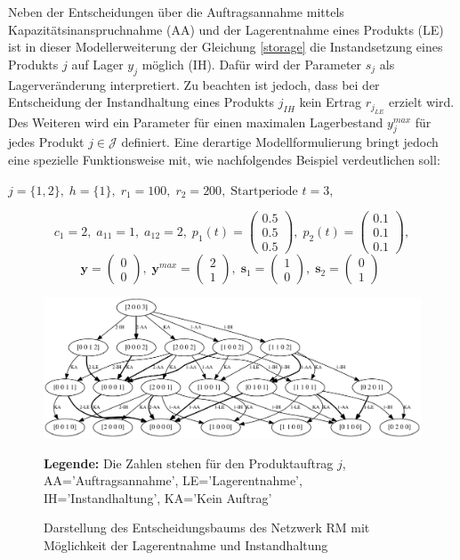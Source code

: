 Neben der Entscheidungen über die Auftragsannahme mittels Kapazitätsinanspruchnahme (AA) und der Lagerentnahme eines Produkts (LE) ist in dieser Modellerweiterung der Gleichung \eqref{storage} die Instandsetzung eines Produkts $j$ auf Lager $y_{j}$ möglich (IH). Dafür wird der Parameter $s_{j}$ als Lagerveränderung interpretiert. Zu beachten ist jedoch, dass bei der Entscheidung der Instandhaltung eines Produkts $j_{IH}$ kein Ertrag $r_{j_{LE}}$ erzielt wird. Des Weiteren wird ein Parameter für einen maximalen Lagerbestand $y_{j}^{max}$ für jedes Produkt $j\in\mathcal{J}$ definiert. Eine derartige Modellformulierung bringt jedoch eine spezielle Funktionsweise mit, wie nachfolgendes Beispiel verdeutlichen soll:
\begin{center}
$j = \{1, 2\}, \; h = \{1\}, \; r_{1} = 100, \; r_{2} = 200, \; \text{Startperiode } t=3$,
\end{center}
\[
    c_{1}=2, \;
    a_{11}=1, \;
     a_{12}=2, \;
     p_{1}(t)=\begin{pmatrix} 0.5\\ 0.5\\ 0.5  \end{pmatrix}, \;
     p_{2}(t)=\begin{pmatrix} 0.1\\ 0.1\\ 0.1  \end{pmatrix},
  \]
  \[
    \textbf{y}=\begin{pmatrix} 0 \\ 0 \end{pmatrix}, \;
    \textbf{y}^{max}=\begin{pmatrix} 2 \\ 1 \end{pmatrix}, \;
    \textbf{s}_1=\begin{pmatrix} 1 \\ 0 \end{pmatrix}, \;
     \textbf{s}_2=\begin{pmatrix} 0 \\ 1 \end{pmatrix} \;
  \]
\begin{figure}[h!]
  \begin{center}
    \includegraphics[width=130mm]{Bilder/Beispiel4.pdf}
    \caption{Darstellung des Entscheidungsbaums des Netzwerk RM mit Möglichkeit der Lagerentnahme und Instandhaltung}  \label{B4}
    {\footnotesize \textbf{Legende:} Die Zahlen stehen für den Produktauftrag $j$, AA='Auftragsannahme', LE='Lagerentnahme', IH='Instandhaltung', KA='Kein Auftrag'} 
  \end{center}
\end{figure}

